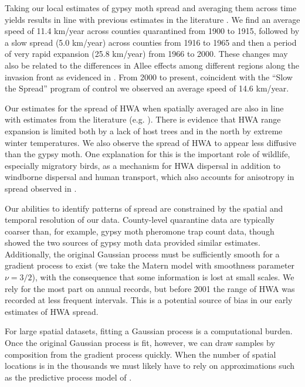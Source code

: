 \documentclass[12pt]{article}
\begin{document}
Taking our local estimates of gypsy moth spread and averaging them across time yields results in line with previous estimates in the literature \citep{liebhold1992gypsy}. We find an average speed of 11.4 km/year across counties quarantined from 1900 to 1915, followed by a slow spread (5.0 km/year) across counties from 1916 to 1965 and then a period of very rapid expansion (25.8 km/year) from 1966 to 2000. These changes may also be related to the differences in Allee effects among different regions along the invasion front as evidenced in \cite{tobin2009role}. From 2000 to present, coincident with the ``Slow the Spread'' program of control \citep{sharov2002slow} we observed an average speed of 14.6 km/year.

Our estimates for the spread of HWA when spatially averaged are also in line with estimates from the literature (e.g. \cite{ward2004eastern}). There is evidence that HWA range expansion is limited both by a lack of host trees and in the north by extreme winter temperatures. We also observe the spread of HWA to appear less diffusive than the gypsy moth. One explanation for this is the important role of wildlife, especially migratory birds, as a mechanism for HWA dispersal \citep{mcclure1990role} in addition to windborne dispersal and human transport, which also accounts for anisotropy in spread observed in \cite{morin2009anisotropic}.

Our abilities to identify patterns of spread are constrained by the spatial and temporal resolution of our data. County-level quarantine data are typically coarser than, for example, gypsy moth pheromone trap count data, though \cite{tobin2007comparison} showed the two sources of gypsy moth data provided similar estimates. Additionally, the original Gaussian process must be sufficiently smooth for a gradient process to exist (we take the Matern model with smoothness parameter $\nu=3/2$), with the consequence that some information is lost at small scales. We rely for the most part on annual records, but before 2001 the range of HWA was recorded at less frequent intervals. This is a potential source of bias in our early estimates of HWA spread.

For large spatial datasets, fitting a Gaussian process is a computational burden. Once the original Gaussian process is fit, however, we can draw samples by composition from the gradient process quickly. When the number of spatial locations is in the thousands we must likely have to rely on approximations such as the predictive process model of \cite{banerjee2008gaussian}.
\end{document}
